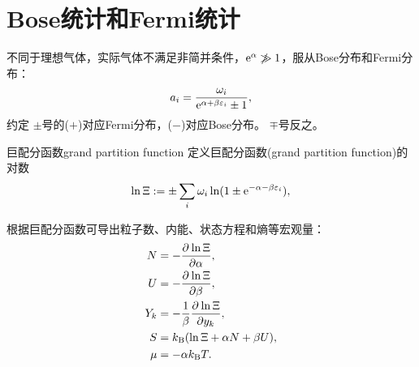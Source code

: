 \newcommand*{\tv}{\mathrm t}  %
\newcommand*{\lt}{\mathrm l}  %
\newcommand*{\Db}{\mathrm D}
\newcommand*{\Fm}{\mathrm F}

\chapter{Bose统计和Fermi统计}

不同于理想气体，实际气体不满足非简并条件，$\mathop{}\!\mathrm{e}^\alpha\not\gg 1$，服从Bose分布和Fermi分布：
\begin{equation}
	a_i=\frac{\omega_i}{\mathop{}\!\mathrm{e}^{\alpha+\beta\varepsilon_i}\pm 1},
\end{equation}
约定
$\pm$号的($+$)对应Fermi分布，($-$)对应Bose分布。
$\mp$号反之。

\begin{definition}{巨配分函数}{grand partition function}
	定义巨配分函数(grand partition function)的对数
	\begin{equation}
		\ln\Xi:=\pm\sum_i\omega_i\ln(1\pm\mathop{}\!\mathrm{e}^{-\alpha-\beta\varepsilon_i}),
	\end{equation}
\end{definition}

\begin{corollary}
	根据巨配分函数可导出粒子数、内能、状态方程和熵等宏观量：
	\begin{subequations}
		\begin{align}
			N&=-\frac{\partial^{{}}\ln\Xi}{\partial{\alpha}^{{}}},\\
			U&=-\frac{\partial^{{}}\ln\Xi}{\partial{\beta}^{{}}},\\
			Y_k&=-\frac1\beta\frac{\partial^{{}}\ln\Xi}{\partial{y_k}^{{}}},\\
			S&=k_{\mathrm B}(\ln\Xi+\alpha N+\beta U),\\
			\mu&=-\alpha k_{\mathrm B} T.
		\end{align}
	\end{subequations}
\end{corollary}

